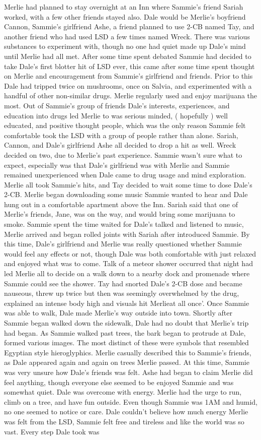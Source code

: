 \documentclass[12pt]{book}
\begin{document}
Merlie had planned to stay overnight at an Inn where Sammie's friend Sariah worked, with a few other friends stayed also. Dale would be Merlie's boyfriend Cannon, Sammie's girlfriend Ashe, a friend planned to use 2-CB named Tay, and another friend who had used LSD a few times named Wreck. There was various substances to experiment with, though no one had quiet made up Dale's mind until Merlie had all met. After some time spent debated Sammie had decided to take Dale's first blotter hit of LSD ever, this came after some time spent thought on Merlie and encouragement from Sammie's girlfriend and friends. Prior to this Dale had tripped twice on mushrooms, once on Salvia, and experimented with a handful of other non-similar drugs. Merlie regularly used and enjoy marijuana the most. Out of Sammie's group of friends Dale's interests, experiences, and education into drugs led Merlie to was serious minded, ( hopefully ) well educated, and positive thought people, which was the only reason Sammie felt comfortable took the LSD with a group of people rather than alone. Sariah, Cannon, and Dale's girlfriend Ashe all decided to drop a hit as well. Wreck decided on two, due to Merlie's past experience. Sammie wasn't sure what to expect, especially was that Dale's girlfriend was with Merlie and Sammie remained unexperienced when Dale came to drug usage and mind exploration. Merlie all took Sammie's hits, and Tay decided to wait some time to dose Dale's 2-CB. Merlie began downloading some music Sammie wanted to hear and Dale hung out in a comfortable apartment above the Inn. Sariah said that one of Merlie's friends, Jane, was on the way, and would bring some marijuana to smoke. Sammie spent the time waited for Dale's talked and listened to music, Merlie arrived and began rolled joints with Sariah after introduced Sammie. By this time, Dale's girlfriend and Merlie was really questioned whether Sammie would feel any effects or not, though Dale was both comfortable with just relaxed and enjoyed what was to come. Talk of a meteor shower occurred that night had led Merlie all to decide on a walk down to a nearby dock and promenade where Sammie could see the shower. Tay had snorted Dale's 2-CB dose and became nauseous, threw up twice but then was seemingly overwhelmed by the drug, explained an intense body high and visuals hit Merlieat all once'. Once Sammie was able to walk, Dale made Merlie's way outside into town. Shortly after Sammie began walked down the sidewalk, Dale had no doubt that Merlie's trip had began. As Sammie walked past trees, the bark began to protrude at Dale, formed various images. The most distinct of these were symbols that resembled Egyptian style hieroglyphics. Merlie casually described this to Sammie's friends, as Dale appeared again and again on trees Merlie passed. At this time, Sammie was very unsure how Dale's friends was felt. Ashe had began to claim Merlie did feel anything, though everyone else seemed to be enjoyed Sammie and was somewhat quiet. Dale was overcome with energy. Merlie had the urge to run, climb on a tree, and have fun outside. Even though Sammie was 1AM and humid, no one seemed to notice or care. Dale couldn't believe how much energy Merlie was felt from the LSD, Sammie felt free and tireless and like the world was so vast. Every step Dale took was 
\end{document}
